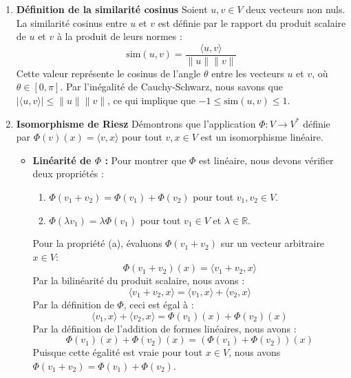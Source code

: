 \documentclass[11pt,a4paper]{report}
\begin{document}
\begin{enumerate}
\def\labelenumi{\arabic{enumi}.}
\item
  \textbf{Définition de la similarité cosinus} Soient \(u, v \in V\)
  deux vecteurs non nuls. La similarité cosinus entre \(u\) et \(v\) est
  définie par le rapport du produit scalaire de \(u\) et \(v\) à la
  produit de leurs normes :
  \[ \text{sim}(u,v) = \frac{\langle u, v \rangle}{\|u\| \|v\|} \] Cette
  valeur représente le cosinus de l'angle \(\theta\) entre les vecteurs
  \(u\) et \(v\), où \(\theta \in [0, \pi]\). Par l'inégalité de
  Cauchy-Schwarz, nous savons que
  \(|\langle u, v \rangle| \le \|u\| \|v\|\), ce qui implique que
  \(-1 \le \text{sim}(u,v) \le 1\).
\item
  \textbf{Isomorphisme de Riesz} Démontrons que l'application
  \(\Phi: V \to V^*\) définie par \(\Phi(v)(x) = \langle v, x \rangle\)
  pour tout \(v, x \in V\) est un isomorphisme linéaire.

  \begin{itemize}
  \item
    \textbf{Linéarité de \(\Phi\) :} Pour montrer que \(\Phi\) est
    linéaire, nous devons vérifier deux propriétés :

    \begin{enumerate}
    \def\labelenumii{\alph{enumii}.}

    \item
      \(\Phi(v_1 + v_2) = \Phi(v_1) + \Phi(v_2)\) pour tout
      \(v_1, v_2 \in V\).
    \item
      \(\Phi(\lambda v_1) = \lambda \Phi(v_1)\) pour tout \(v_1 \in V\)
      et \(\lambda \in \mathbb{R}\).
    \end{enumerate}

    Pour la propriété (a), évaluons \(\Phi(v_1 + v_2)\) sur un vecteur
    arbitraire \(x \in V\):
    \[ \Phi(v_1 + v_2)(x) = \langle v_1 + v_2, x \rangle \] Par la
    bilinéarité du produit scalaire, nous avons :
    \[ \langle v_1 + v_2, x \rangle = \langle v_1, x \rangle + \langle v_2, x \rangle \]
    Par la définition de \(\Phi\), ceci est égal à :
    \[ \langle v_1, x \rangle + \langle v_2, x \rangle = \Phi(v_1)(x) + \Phi(v_2)(x) \]
    Par la définition de l'addition de formes linéaires, nous avons :
    \[ \Phi(v_1)(x) + \Phi(v_2)(x) = (\Phi(v_1) + \Phi(v_2))(x) \]
    Puisque cette égalité est vraie pour tout \(x \in V\), nous avons
    \(\Phi(v_1 + v_2) = \Phi(v_1) + \Phi(v_2)\).


\end{itemize}
\end{enumerate}
\end{document}
